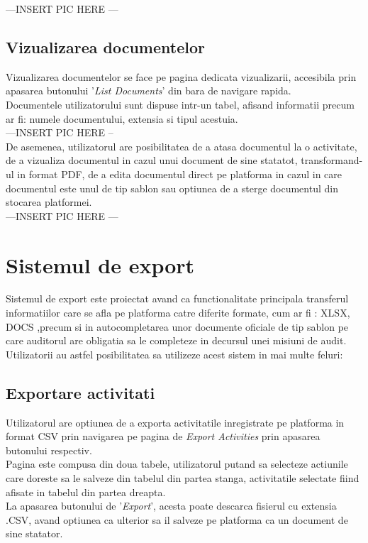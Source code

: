 ---INSERT PIC HERE --- 


\subsection*{Vizualizarea documentelor}

Vizualizarea documentelor se face pe pagina dedicata vizualizarii, accesibila prin apasarea butonului
'\textit{List Documents}' din bara de navigare rapida.\\
Documentele utilizatorului sunt dispuse intr-un tabel, afisand informatii precum ar fi: numele documentului, extensia si tipul acestuia.\\

---INSERT PIC HERE --\\
De asemenea, utilizatorul are posibilitatea de a atasa documentul la o activitate, de a vizualiza documentul in cazul unui document de sine statatot, transformand-ul in format PDF, de a edita documentul direct pe platforma in cazul in care documentul este unul de tip sablon sau optiunea de a sterge documentul din stocarea platformei.\\

---INSERT PIC HERE ---



\section{Sistemul de export}

Sistemul de export este proiectat avand ca functionalitate principala transferul informatiilor care se afla pe platforma catre diferite formate, cum ar fi : XLSX, DOCS ,precum si in autocompletarea unor documente oficiale de tip sablon pe care auditorul are obligatia sa le completeze in decursul unei misiuni de audit.\\
Utilizatorii au astfel posibilitatea sa utilizeze acest sistem in mai multe feluri:
\subsection*{Exportare activitati}
Utilizatorul are optiunea de a exporta activitatile inregistrate pe platforma in format CSV prin navigarea pe pagina de \textit{Export Activities} prin apasarea butonului respectiv.\\
Pagina este compusa din doua tabele, utilizatorul putand sa selecteze actiunile care doreste sa le salveze din tabelul din partea stanga, activitatile selectate fiind afisate in tabelul din partea dreapta.\\
La apasarea butonului de '\textit{Export}', acesta poate descarca fisierul cu extensia .CSV, avand optiunea ca ulterior sa il salveze pe platforma ca un document de sine statator.\\

